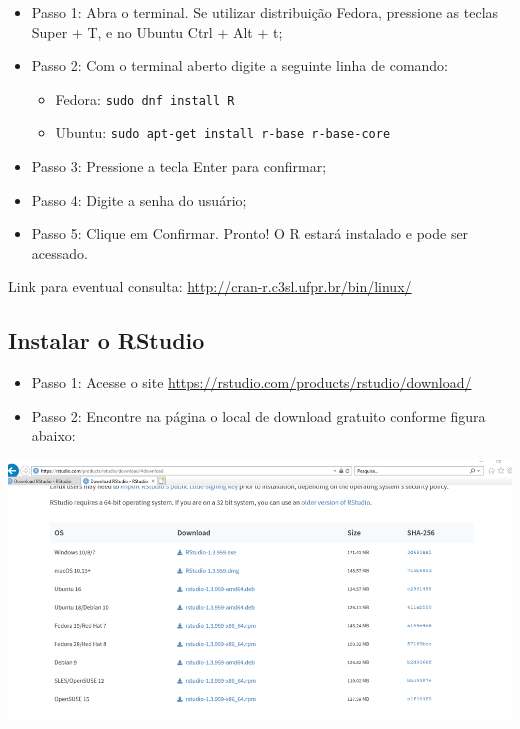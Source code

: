 \documentclass[
  10pt,
  brazil,
  a4paper,
  twoside, notitlepage, openright]{book}
\providecommand{\tightlist}{%
  \setlength{\itemsep}{0pt}\setlength{\parskip}{0pt}}
\begin{document}
\begin{itemize}
\tightlist
\item
  Passo 1: Abra o terminal. Se utilizar distribuição Fedora, pressione as teclas Super + T, e no Ubuntu Ctrl + Alt + t;\\
\item
  Passo 2: Com o terminal aberto digite a seguinte linha de comando:

  \begin{itemize}
  \tightlist
  \item
    Fedora: \texttt{sudo\ dnf\ install\ R}
  \item
    Ubuntu: \texttt{sudo\ apt-get\ install\ r-base\ r-base-core}\\
  \end{itemize}
\item
  Passo 3: Pressione a tecla Enter para confirmar;\\
\item
  Passo 4: Digite a senha do usuário;\\
\item
  Passo 5: Clique em Confirmar. Pronto! O R estará instalado e pode ser acessado.
\end{itemize}

Link para eventual consulta: \url{http://cran-r.c3sl.ufpr.br/bin/linux/}

\hypertarget{instalar-o-rstudio}{%
\subsection{Instalar o RStudio}\label{instalar-o-rstudio}}

\begin{itemize}
\tightlist
\item
  Passo 1: Acesse o site \url{https://rstudio.com/products/rstudio/download/}\\
\item
  Passo 2: Encontre na página o local de download gratuito conforme figura abaixo:
\end{itemize}

\includegraphics[width=13.54in]{img/inst_1_rstudio}
\end{document}

